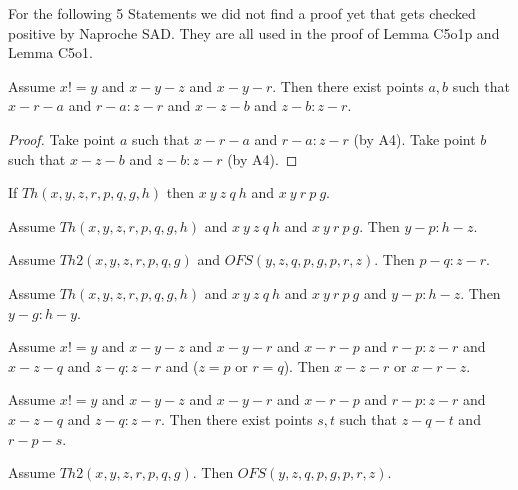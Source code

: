 \documentclass{article}
\begin{document}
  For the following 5 Statements we did not find a proof yet that gets checked positive by Naproche SAD. They are all used in the proof of Lemma C5o1p and Lemma C5o1.

  \begin{forthel}
    \begin{lemma}[C5o1f]
      Assume $x != y$ and $x-y-z$ and $x-y-r$. Then there exist points $a,b$ such that $x-r-a$ and $r-a : z-r$ and $x-z-b$ and $z-b : z-r$.
    \end{lemma}
    \begin{proof}
    	Take point $a$ such that $x-r-a$ and $r-a : z-r$ (by A4).	Take point $b$ such that $x-z-b$ and $z-b : z-r$ (by A4).
    \end{proof}

    \begin{axiom}[C5o1g]
      If $Th(x,y,z,r,p,q,g,h)$ then $x~y~z~q~h$ and $x~y~r~p~g$.
    \end{axiom}

    \begin{axiom}[C5o1h]
      Assume $Th(x,y,z,r,p,q,g,h)$ and $x~y~z~q~h$ and $x~y~r~p~g$. Then $y-p : h-z$.
    \end{axiom}

    \begin{axiom}[C5o1i]
      Assume $Th2(x,y,z,r,p,q,g)$ and $OFS(y,z,q,p,g,p,r,z)$. Then $p-q : z-r$.
    \end{axiom}

    \begin{axiom}[C5o1j]
      Assume $Th(x,y,z,r,p,q,g,h)$ and $x~y~z~q~h$ and $x~y~r~p~g$ and $y-p : h-z$. Then $y-g : h-y$.
    \end{axiom}



    \begin{lemma}[C5o1k]
      Assume $x != y$ and $x-y-z$ and $x-y-r$ and $x-r-p$ and $r-p : z-r$ and $x-z-q$ and $z-q : z-r$ and ($z = p$ or $r = q$). Then $x-z-r$ or $x-r-z$.
    \end{lemma}

    \begin{lemma}[C5o1l]
      Assume $x != y$ and $x-y-z$ and $x-y-r$ and $x-r-p$ and $r-p : z-r$ and $x-z-q$ and $z-q : z-r$. Then there exist points $s,t$ such that $z-q-t$ and $r-p-s$.
    \end{lemma}

    \begin{lemma}[C5o1m]
      Assume $Th2(x,y,z,r,p,q,g)$. Then $OFS(y,z,q,p,g,p,r,z)$.
    \end{lemma}


\end{forthel}
\end{document}
